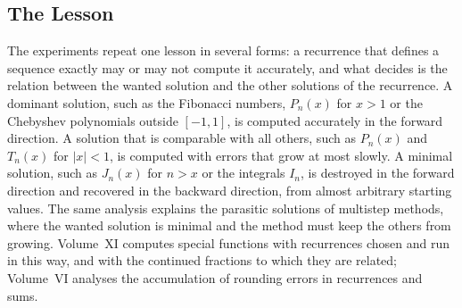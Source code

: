 \begin{table}
\end{table}

\subsection{The Lesson}

The experiments repeat one lesson in several forms: a recurrence that defines a sequence exactly may or may not compute it accurately, and what decides is the relation between the wanted solution and the other solutions of the recurrence. A dominant solution, such as the Fibonacci numbers, $P_n(x)$ for $x>1$ or the Chebyshev polynomials outside $[-1,1]$, is computed accurately in the forward direction. A solution that is comparable with all others, such as $P_n(x)$ and $T_n(x)$ for $|x|<1$, is computed with errors that grow at most slowly. A minimal solution, such as $J_n(x)$ for $n>x$ or the integrals $I_n$, is destroyed in the forward direction and recovered in the backward direction, from almost arbitrary starting values. The same analysis explains the parasitic solutions of multistep methods, where the wanted solution is minimal and the method must keep the others from growing. Volume~XI computes special functions with recurrences chosen and run in this way, and with the continued fractions to which they are related; Volume~VI analyses the accumulation of rounding errors in recurrences and sums.

